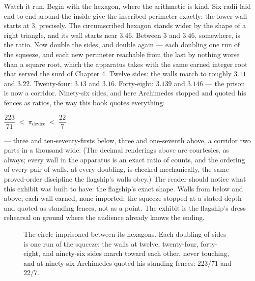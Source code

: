 Watch it run. Begin with the hexagon, where the arithmetic is kind. Six radii laid
end to end around the inside give the inscribed perimeter exactly: the lower wall
starts at $3$, precisely. The circumscribed hexagon stands wider by the shape of a
right triangle, and its wall starts near $3.46$. Between $3$ and $3.46$, somewhere,
is the ratio. Now double the sides, and double again --- each doubling one run of
the squeeze, and each new perimeter reachable from the last by nothing worse than a
square root, which the apparatus takes with the same earned integer root that
served the surd of Chapter 4. Twelve sides: the walls march to roughly $3.11$ and
$3.22$. Twenty-four: $3.13$ and $3.16$. Forty-eight: $3.139$ and $3.146$ --- the
prison is now a corridor. Ninety-six sides, and here Archimedes stopped and quoted
his fences as ratios, the way this book quotes everything:

\begin{center}
$\dfrac{223}{71} \;<\; \pi_{\mathrm{device}} \;<\; \dfrac{22}{7}$
\end{center}

--- three and ten-seventy-firsts below, three and one-seventh above, a corridor two
parts in a thousand wide. (The decimal renderings above are courtesies, as always;
every wall in the apparatus is an exact ratio of counts, and the ordering of every
pair of walls, at every doubling, is checked mechanically, the same proved-order
discipline the flagship's walls obey.) The reader should notice what this exhibit
was built to have: the flagship's exact shape. Walls from below and above; each
wall earned, none imported; the squeeze stopped at a stated depth and quoted as
standing fences, not as a point. The exhibit is the flagship's dress rehearsal on
ground where the audience already knows the ending.

\begin{figure}[htbp]
\centering
{}
\caption{The circle imprisoned between its hexagons. Each doubling of sides is one
run of the squeeze: the walls at twelve, twenty-four, forty-eight, and ninety-six
sides march toward each other, never touching, and at ninety-six Archimedes quoted
his standing fences: $223/71$ and $22/7$.}
\end{figure}

